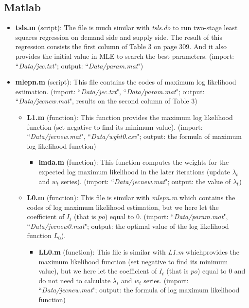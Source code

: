 \documentclass[12pt]{article}
\begin{document}
\subsection{Matlab}
\begin{itemize}
\item \textbf{tsls.m} (script): The file is much similar with \textit{tsls.do} to run two-stage least squares regression on demand side and supply side. The result of this regression consists the first column of Table 3 on page 309. And it also provides the initial value in MLE to search the best parameters. (import: ``\textit{Data/jec.txt}"; output: ``\textit{Data/param.mat}")

\item \textbf{mlepn.m} (script): This file contains the codes of maximum log likelihood estimation. (import: ``\textit{Data/jec.txt}", ``\textit{Data/param.mat}"; output: ``\textit{Data/jecnew.mat}", results on the second column of Table 3)
	\begin{itemize}
	\item \textbf{L1.m} (function): This function provides the maximum log likelihood function (set negative to find its minimum value). (import: ``\textit{Data/jecnew.mat}", ``\textit{Data/wght0.csv}"; output: the formula of maximum log likelihood function)
		\begin{itemize}
		\item \textbf{lmda.m} (function): This function computes the weights for the expected log maximum likelihood in the later iterations (update $\lambda_t$ and $w_t$ series). (import: ``\textit{Data/jecnew.mat}"; output: the value of $\lambda_t$)
		\end{itemize}
    \item \textbf{L0.m} (function): This file is similar with \textit{mlepn.m} which contains the codes of log maximum likelihood estimation, but we here let the coefficient of $I_t$ (that is $po$) equal to 0. (import: ``\textit{Data/param.mat}", ``\textit{Data/jecnew0.mat}"; output: the optimal value of the log likelihood function $L_0$).
		\begin{itemize}
		\item \textbf{LL0.m} (function): This file is similar with \textit{L1.m} whichprovides the maximum likelihood function (set negative to find its minimum value), but we here let the coefficient of $I_t$ (that is $po$) equal to 0 and do not need to calculate $\lambda_t$ and $w_t$ series. (import: ``\textit{Data/jecnew.mat}"; output: the formula of log maximum likelihood function)
		\end{itemize}
	\end{itemize}
\end{itemize}
\end{document}

